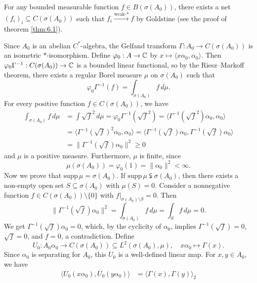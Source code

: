 \begin{myproof}
  For any bounded measurable function $f \in B(\sigma(A_0))$, there exists a net $(f_i)_i \subseteq C(\sigma(A_0))$
  such that $f_i \xrightarrow{\textrm{weak-$*$}} f$ by Goldstine (see the proof of theorem \ref{thm:6.1}).
\end{myproof}
\begin{myproof}
  Since $A_0$ is an abelian $C^*$-algebra, the Gelfand transform $\Gamma: A_0 \to C(\sigma(A_0))$ is an isometric $*$-isomorphism. Define $\varphi_0: A \to \mathbb {C}$ by $x \mapsto \langle x \alpha_0, \alpha_0\rangle$. Then $\varphi_0 \Gamma^{-1} : C(\sigma(A_0)) \to \mathbb {C}$ is a bounded linear functional, so by the Riesz--Markoff theorem, there exists a regular Borel measure $\mu$ on $\sigma(A_0)$ such that
  $$ \varphi_0 \Gamma^{-1} (f) = \int_{\sigma(A_0)} f\, d\mu. $$
  For every positive function $f \in C(\sigma(A_0))$, we have 
  \begin{align*}
    \int_{\sigma(A_0)} f\, d\mu &= \int \sqrt{f}^2\, d\mu = \varphi_0 \Gamma^{-1} (\sqrt{f}^2) = \langle \Gamma^{-1} (\sqrt{f}^2) \alpha_0, \alpha_0 \rangle \\
    &= \langle \Gamma^{-1} (\sqrt{f})^2 \alpha_0, \alpha_0 \rangle = \langle \Gamma^{-1} (\sqrt{f}) \alpha_0, \Gamma^{-1} (\sqrt{f}) \alpha_0 \rangle \\
    &= \| \Gamma^{-1} (\sqrt{f}) \alpha_0 \|^2 \geq 0
  \end{align*}
  and $\mu$ is a positive measure. Furthermore, $\mu$ is finite, since 
  $$ \mu(\sigma(A_0)) = \varphi_0 (1) = \|\alpha_0\|^2 < \infty. $$
  Now we prove that $\mathrm{supp}\, \mu = \sigma(A_0)$. If $\mathrm{supp}\, \mu \subsetneqq \sigma(A_0)$, then there exists a non-empty open set $S \subseteq \sigma(A_0)$ with $\mu(S) = 0$. Consider a nonnegative function $f \in C(\sigma(A_0)) \setminus \{0\}$ with $f\big|_{\sigma(A_0) \setminus S} = 0$. Then 
  $$ \| \Gamma^{-1} (\sqrt{f}) \alpha_0 \|^2 = \int_{\sigma(A_0)} f\, d\mu = \int_S f\, d\mu = 0. $$
  We get $\Gamma^{-1} (\sqrt{f}) \alpha_0 = 0$, which, by the cyclicity of $\alpha_0$, implies $\Gamma^{-1} (\sqrt{f}) = 0$, $\sqrt{f} = 0$, and $f = 0$, a contradiction. 
  Define 
  $$ U_0 : A_0 \alpha_0 \to C(\sigma(A_0)) \subseteq L^2 (\sigma(A_0), \mu), \quad x \alpha_0 \mapsto \Gamma(x). $$
  Since $\alpha_0$ is separating for $A_0$, this $U_0$ is a well-defined linear map. For $x, y \in A_0$, we have 
  \begin{align*}
    \langle U_0 (x \alpha_0), U_0 (y \alpha_0) \rangle &= \langle \Gamma(x), \Gamma(y)\rangle_2 \\

\end{align*}
\end{myproof}
